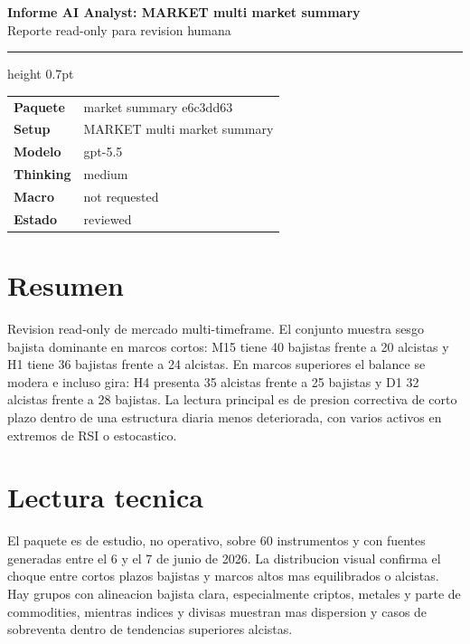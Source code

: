 \documentclass[11pt,a4paper]{article}
\begin{document}
\begin{center}
{\huge\bfseries Informe AI Analyst: MARKET multi market summary}\\[0.25em]
{\large Reporte read-only para revision humana}
\end{center}

\vspace{0.2em}
\hrule height 0.7pt
\vspace{0.9em}

\begin{tabularx}{\textwidth}{>{\bfseries}p{3.2cm}X}
Paquete & market summary e6c3dd63 \\
Setup & MARKET multi market summary \\
Modelo & gpt-5.5 \\
Thinking & medium \\
Macro & not requested \\
Estado & reviewed \\
\end{tabularx}

\vspace{0.75em}

\vspace{0.4em}

\section*{Resumen}
Revision read-only de mercado multi-timeframe. El conjunto muestra sesgo bajista dominante en marcos cortos: M15 tiene 40 bajistas frente a 20 alcistas y H1 tiene 36 bajistas frente a 24 alcistas. En marcos superiores el balance se modera e incluso gira: H4 presenta 35 alcistas frente a 25 bajistas y D1 32 alcistas frente a 28 bajistas. La lectura principal es de presion correctiva de corto plazo dentro de una estructura diaria menos deteriorada, con varios activos en extremos de RSI o estocastico.

\section*{Lectura tecnica}
El paquete es de estudio, no operativo, sobre 60 instrumentos y con fuentes generadas entre el 6 y el 7 de junio de 2026. La distribucion visual confirma el choque entre cortos plazos bajistas y marcos altos mas equilibrados o alcistas. Hay grupos con alineacion bajista clara, especialmente criptos, metales y parte de commodities, mientras indices y divisas muestran mas dispersion y casos de sobreventa dentro de tendencias superiores alcistas.
\end{document}
